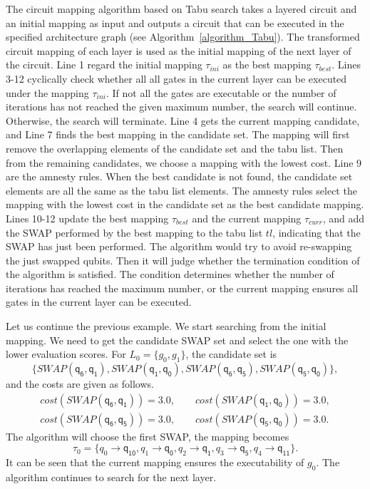 \documentclass[runningheads]{llncs}
\begin{document}
	The circuit mapping algorithm based on Tabu search takes a layered circuit and an initial mapping as input and outputs a circuit that can be executed in the specified architecture graph (see Algorithm~\ref{algorithm_Tabu}). The transformed circuit mapping of each layer is used as the initial mapping of the next layer of the circuit. Line 1 regard the initial mapping $\tau_{ini}$ as the best mapping $\tau_{best}$. Lines 3-12 cyclically check whether all all gates in the current layer can be executed under the mapping $\tau_{ini}$. If not all the gates are executable or the number of iterations has not reached the given maximum number, the search will continue. Otherwise, the search will terminate. Line 4 gets the current mapping candidate, and Line 7 finds the best mapping in the candidate set. The mapping will first remove the overlapping elements of the candidate set and the tabu list. Then from the remaining candidates, we choose a mapping with the lowest cost. Line 9 are the amnesty rules. When the best candidate is not found, the candidate set elements are all the same as the tabu list elements. The amnesty rules select the mapping with the lowest cost in the candidate set as the best candidate mapping. Lines 10-12 update the best mapping $\tau_{best}$ and the current mapping $\tau_{curr}$, and add the SWAP performed by the best mapping to the tabu list $tl$, indicating that the SWAP has just been performed. The algorithm would try to avoid re-swapping the just swapped qubits. Then it will judge whether the termination condition of the algorithm is satisfied. The condition determines whether the number of iterations has reached the maximum number, or the current mapping ensures all gates in the current layer can be executed. 
\begin{example}
Let us continue the previous example. We start searching from the initial mapping. We need to get the candidate SWAP set and select the one with the lower evaluation scores.
For $L_{0}=\{g_{0},g_{1}\}$, the candidate set is 
$$\{SWAP(\textsf{q}_\textsf{6},\textsf{q}_\textsf{1}), SWAP(\textsf{q}_\textsf{1},\textsf{q}_\textsf{0}), SWAP(\textsf{q}_\textsf{6},\textsf{q}_\textsf{5}), SWAP(\textsf{q}_\textsf{5},\textsf{q}_\textsf{0}) \} , $$ and the costs are given as follows.
\[\begin{array}{l}
cost(SWAP(\textsf{q}_\textsf{6},\textsf{q}_\textsf{1}))=3.0, \qquad cost(SWAP(\textsf{q}_\textsf{1},\textsf{q}_\textsf{0}))=3.0,\\ cost(SWAP(\textsf{q}_\textsf{6},\textsf{q}_\textsf{5}))=3.0, \qquad cost(SWAP(\textsf{q}_\textsf{5},\textsf{q}_\textsf{0}))=3.0 .
\end{array}\]
The algorithm will choose the first SWAP, the mapping becomes $$\tau_{0}=\{\textit{q}_\textit{0}\rightarrow  \textsf{q}_\textsf{10},\textit{q}_\textit{1}\rightarrow  \textsf{q}_\textsf{0},
\textit{q}_\textit{2}\rightarrow  \textsf{q}_\textsf{1},\textit{q}_\textit{3}\rightarrow  \textsf{q}_\textsf{5},\textit{q}_\textit{4}\rightarrow  \textsf{q}_\textsf{11}\} . $$ 
 It can be seen that the current mapping ensures the executability of $g_{0}$. The algorithm continues to search for the next layer.
\end{example}
\end{document}
